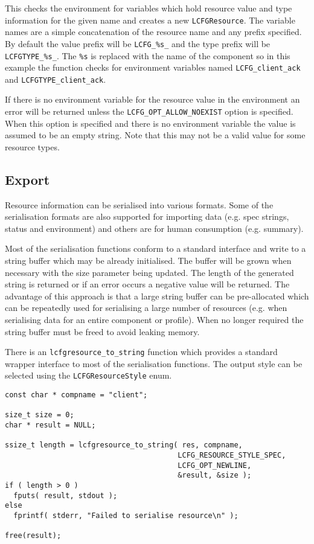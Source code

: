 \documentclass[11pt,a4paper,titlepage]{article}
\begin{document}
This checks the environment for variables which hold resource value
and type information for the given name and creates a new
\texttt{LCFGResource}. The variable names are a simple concatenation
of the resource name and any prefix specified.  By default the value
prefix will be \texttt{LCFG\_\%s\_} and the type prefix will be
\texttt{LCFGTYPE\_\%s\_}. The \texttt{\%s} is replaced with the name
of the component so in this example the function checks for
environment variables named \texttt{LCFG\_client\_ack} and
\texttt{LCFGTYPE\_client\_ack}.

If there is no environment variable for the resource value in the
environment an error will be returned unless the
\texttt{LCFG\_OPT\_ALLOW\_NOEXIST} option is specified. When this
option is specified and there is no environment variable the value is
assumed to be an empty string. Note that this may not be a valid value
for some resource types.

\subsection{Export}

Resource information can be serialised into various formats. Some of
the serialisation formats are also supported for importing data
(e.g. spec strings, status and environment) and others are for human
consumption (e.g. summary).

Most of the serialisation functions conform to a standard interface
and write to a string buffer which may be already initialised. The
buffer will be grown when necessary with the size parameter being
updated. The length of the generated string is returned or if an error
occurs a negative value will be returned. The advantage of this
approach is that a large string buffer can be pre-allocated which can
be repeatedly used for serialising a large number of resources
(e.g. when serialising data for an entire component or profile). When
no longer required the string buffer must be freed to avoid leaking
memory.

There is an \texttt{lcfgresource\_to\_string} function which provides
a standard wrapper interface to most of the serialisation
functions. The output style can be selected using the
\texttt{LCFGResourceStyle} enum.

\begin{verbatim}
const char * compname = "client";

size_t size = 0;
char * result = NULL;

ssize_t length = lcfgresource_to_string( res, compname,
                                        LCFG_RESOURCE_STYLE_SPEC,
                                        LCFG_OPT_NEWLINE,
                                        &result, &size );
if ( length > 0 )
  fputs( result, stdout );
else
  fprintf( stderr, "Failed to serialise resource\n" );

free(result);
\end{verbatim}
\end{document}
